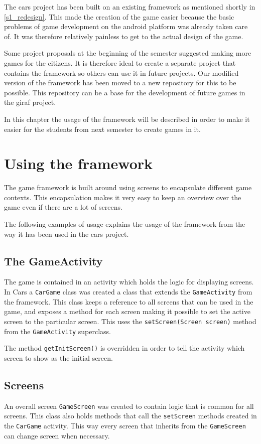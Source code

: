 The cars project has been built on an existing framework as mentioned shortly in \cref{s1_redesign}. 
This made the creation of the game easier because the basic problems of game development on the android platform was already taken care of.
It was therefore relatively painless to get to the actual design of the game. 

Some project proposals at the beginning of the semester suggested making more games for the citizens.
It is therefore ideal to create a separate project that contains the framework so others can use it in future projects.
Our modified version of the framework has been moved to a new repository for this to be possible.
This repository can be a base for the development of future games in the giraf project.

In this chapter the usage of the framework will be described in order to make it easier for the students from next semester to create games in it.

\section{Using the framework}
The game framework is built around using screens to encapsulate different game contexts. 
This encapsulation makes it very easy to keep an overview over the game even if there are a lot of screens.

The following examples of usage explains the usage of the framework from the way it has been used in the cars project.

\subsection{The GameActivity}
The game is contained in an activity which holds the logic for displaying screens.
In Cars a \lstinline|CarGame| class was created a class  that extends the \lstinline|GameActivity| from the framework. 
This class keeps a reference to all screens that can be used in the game, and exposes a method for each screen making it possible to set the active screen to the particular screen.
This uses the \lstinline|setScreen(Screen screen)| method from the \lstinline|GameActivity| superclass. 

The method \lstinline|getInitScreen()| is overridden in order to tell the activity which screen to show as the initial screen.

\subsection{Screens}
An overall screen \lstinline|GameScreen| was created to contain logic that is common for all screens.
This class also holds methods that call the \lstinline|setScreen| methods created in the \lstinline|CarGame| activity.
This way every screen that inherits from the \lstinline|GameScreen| can change screen when necessary.

